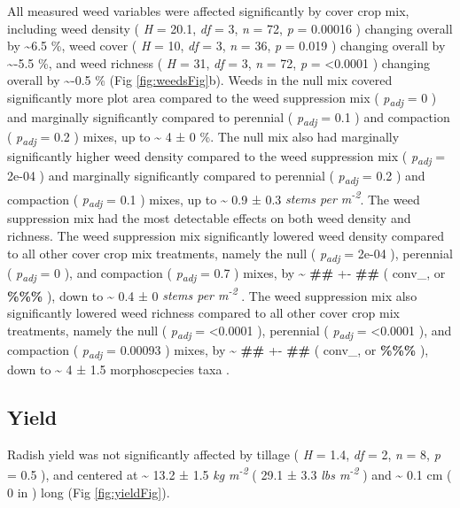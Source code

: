 \documentclass[
  12pt,
]{article}
\begin{document}
All measured weed variables were affected significantly by cover crop mix, including
weed density (
\emph{H} = 20.1,
\emph{df} = 3,
\emph{n} = 72,
\emph{p} = 0.00016
) changing overall by
\textasciitilde6.5 \%,
weed cover (
\emph{H} = 10,
\emph{df} = 3,
\emph{n} = 36,
\emph{p} = 0.019
) changing overall by
\textasciitilde-5.5 \%, and
weed richness (
\emph{H} = 31,
\emph{df} = 3,
\emph{n} = 72,
\emph{p} = \textless0.0001
) changing overall by
\textasciitilde-0.5 \%
(Fig \ref{fig:weedsFig}b).
Weeds in the null mix covered significantly more plot area compared to the weed suppression mix (
\emph{p\textsubscript{adj}} = 0
) and marginally significantly compared to perennial (
\emph{p\textsubscript{adj}} = 0.1
) and compaction (
\emph{p\textsubscript{adj}} = 0.2
) mixes,
up to
\textasciitilde{} 4 ±
0 \%.
The null mix also had marginally significantly higher weed density compared to the weed suppression mix (
\emph{p\textsubscript{adj}} = 2e-04
) and marginally significantly compared to perennial (
\emph{p\textsubscript{adj}} = 0.2
) and compaction (
\emph{p\textsubscript{adj}} = 0.1
) mixes,
up to
\textasciitilde{} 0.9 ±
0.3 \emph{stems per m\textsuperscript{-2}}.
The weed suppression mix had the most detectable effects on both weed density and richness.
The weed suppression mix significantly lowered weed density compared to all other cover crop mix treatments, namely the null (
\emph{p\textsubscript{adj}} = 2e-04
), perennial (
\emph{p\textsubscript{adj}} = 0
), and compaction (
\emph{p\textsubscript{adj}} = 0.7
) mixes, by
\textasciitilde{} \textbf{\#\#} +-
\textbf{\#\#} (
conv\_, or
\textbf{\%\%\%}
), down to
\textasciitilde{} 0.4 ±
0 \emph{stems per m\textsuperscript{-2}}
.
The weed suppression mix also significantly lowered weed richness compared to all other cover crop mix treatments, namely the null (
\emph{p\textsubscript{adj}} = \textless0.0001
), perennial (
\emph{p\textsubscript{adj}} = \textless0.0001
), and compaction (
\emph{p\textsubscript{adj}} = 0.00093
) mixes, by
\textasciitilde{} \textbf{\#\#} +-
\textbf{\#\#} (
conv\_, or
\textbf{\%\%\%}
), down to
\textasciitilde{} 4 ±
1.5 morphoscpecies taxa
.

\hypertarget{yield}{%
\subsection{Yield}\label{yield}}

Radish yield was not significantly affected by tillage (
\emph{H} = 1.4,
\emph{df} = 2,
\emph{n} = 8,
\emph{p} = 0.5
), and centered at
\textasciitilde{} 13.2 ±
1.5 \emph{kg m\textsuperscript{-2}}
(
29.1 ±
3.3 \emph{lbs m\textsuperscript{-2}}
) and
\textasciitilde{} 0.1 cm
(
0 in
)
long (Fig \ref{fig:yieldFig}).
\end{document}
